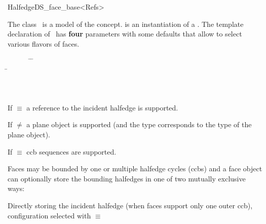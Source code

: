 
\ccRefPageBegin



\begin{ccRefClass}{HalfedgeDS_face_base<Refs>}
  
\ccDefinition
  
The class \ccRefName\ is a model of the 
concept.  is an instantiation of a .  The
template declaration of \ccRefName\ has {\bf\ttfamily four} parameters with some
defaults that allow to select various flavors of faces. 

{\bf\ttfamily

\begin{tabbing}
\mbox{}~~~~~~ \=  \=\\
              \> \> \=\\
              \> \> \>\\
              \> \> \>\\
     \> 
\end{tabbing}

If  $\equiv$  a reference to the incident halfedge is supported.

If  $\neq$  a plane object is supported (and the type  corresponds to the type of the plane object).

If  $\equiv$  ccb sequences are supported.


Faces may be bounded by one or multiple halfedge cycles (ccbs) and a face object can optionally store the bounding halfedges in one of two mutually exclusive ways: 

Directly storing the incident halfedge (when faces support only one outer ccb), configuration selected
with  $\equiv$ 

}
\end{ccRefClass}
